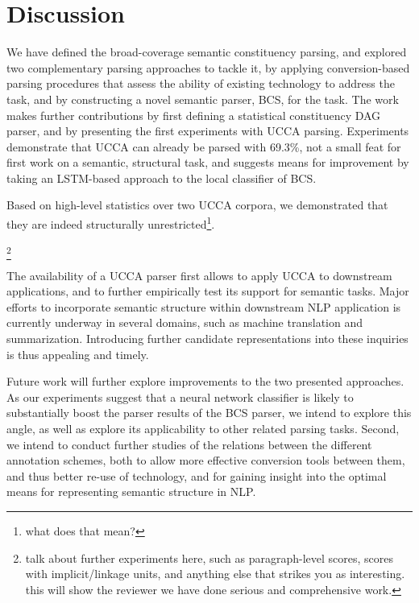 \documentclass[11pt]{article}
\newcommand{\oa}[1]{\footnote{\color{red} #1}}
\begin{document}
\section{Discussion}\label{sec:discussion}

We have defined the broad-coverage semantic constituency parsing,
and explored two complementary parsing approaches to tackle it, by applying
conversion-based parsing procedures that assess the ability of existing
technology to address the task, and by constructing a novel semantic parser, \textsc{BCS}, for
the task. The work makes further contributions
by first defining a statistical constituency DAG parser,
and by presenting the first experiments with UCCA parsing.
Experiments demonstrate that UCCA can already be parsed with 69.3\%, not a small
feat for first work on a semantic, structural task, and suggests means for
improvement by taking an LSTM-based approach to the local classifier of \textsc{BCS}.

Based on high-level statistics over two UCCA corpora, we demonstrated that they are indeed
structurally unrestricted\oa{what does that mean?}.

\oa{talk about further experiments here,
  such as paragraph-level scores, scores with implicit/linkage units, and anything else that
  strikes you as interesting. this will show the reviewer we have done serious
  and comprehensive work.}

The availability of a UCCA parser first allows to apply UCCA to downstream applications,
and to further empirically test its support for semantic tasks. Major efforts to incorporate
semantic structure within downstream NLP application is currently underway in several
domains, such as machine translation \cite{} and summarization{}. Introducing further candidate
representations into these inquiries is thus appealing and timely.

Future work will further explore improvements to the two presented approaches.
As our experiments suggest that a neural network classifier is likely to substantially boost the parser
results of the \textsc{BCS} parser, we intend to explore this angle, as well as explore its applicability
to other related parsing tasks. Second, we intend to conduct further studies of the relations
between the different annotation schemes, both to allow more effective conversion tools between
them, and thus better re-use of technology, and for gaining insight into the optimal means for
representing semantic structure in NLP.
\end{document}
